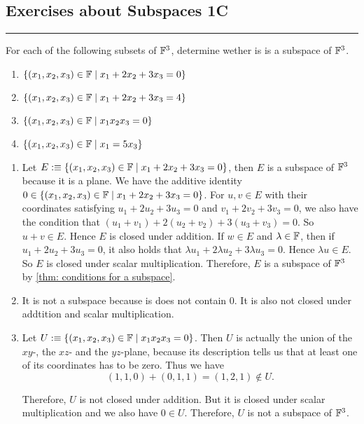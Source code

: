 \subsection*{Exercises about Subspaces 1C}
\hrule
\phantom{.}

\begin{xrcs}
  For each of the following subsets of $\mathbb{F}^3$, determine wether is is a subspace of $\mathbb{F}^3$.
  \begin{enumerate}
    \item $\{(x_1, x_2, x_3) \in \mathbb{F} \mid x_1 + 2x_2 + 3 x_3 = 0\}$
    \item $\{(x_1, x_2, x_3) \in \mathbb{F} \mid x_1 + 2x_2 + 3 x_3 = 4\}$
    \item $\{(x_1, x_2, x_3) \in \mathbb{F} \mid x_1 x_2 x_3 = 0\}$
    \item $\{(x_1, x_2, x_3) \in \mathbb{F} \mid x_1 = 5x_3\}$
  \end{enumerate}

  \begin{enumerate}
    \item Let $E :\equiv \{(x_1, x_2, x_3) \in \mathbb{F} \mid x_1 + 2x_2 + 3 x_3 = 0\}$, then $E$ is a subspace of $\mathbb{F}^3$ because it is a plane. We have the additive identity  $0 \in \{(x_1, x_2, x_3) \in \mathbb{F} \mid x_1 + 2x_2 + 3 x_3 = 0\}$. For $u,v \in E$ with their coordinates satisfying $u_1 + 2u_2 + 3u_3 = 0$ and $v_1 + 2v_2 + 3v_3 = 0$, we also have the condition that $(u_1 + v_1) + 2 (u_2 + v_2) + 3(u_3 + v_3)= 0$. So $u+v \in E$. Hence $E$ is closed under addition. If $w \in E$ and $\lambda \in \mathbb{F}$, then if $u_1 + 2u_2 + 3u_3 = 0$, it also holds that $\lambda u_1 + 2\lambda u_2 + 3\lambda u_3 = 0$. Hence $\lambda u \in E$. So $E$ is closed under scalar multiplication. Therefore, $E$ is a subspace of $\mathbb{F}^3$ by \ref{thm: conditions for a subspace}.

    \item It is not a subspace because is does not contain $0$. It is also not closed under addtition and scalar multiplication.

    \item Let $U :\equiv \{(x_1, x_2, x_3) \in \mathbb{F} \mid x_1 x_2 x_3 = 0\}$. Then $U$ is actually the union of the $xy$-, the $xz$- and the $yz$-plane, because its description tells us that at least one of its coordinates has to be zero. Thus we have
    \[
    (1,1,0) + (0,1,1) = (1,2,1) \notin U.
    \]

    Therefore, $U$ is not closed under addition. But it is closed under scalar multiplication and we also have $0 \in U$. Therefore, $U$ is not a subspace of $\mathbb{F}^3$.


\end{enumerate}
\end{xrcs}
